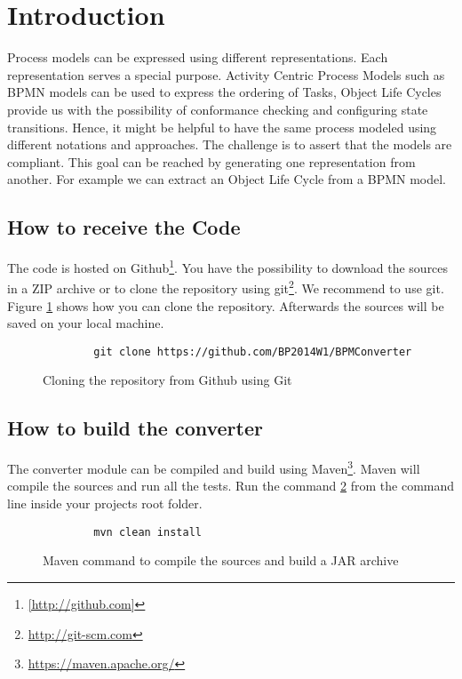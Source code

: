 \section{Introduction}

Process models can be expressed using different representations.
Each representation serves a special purpose.
Activity Centric Process Models such as BPMN models can be used to express the ordering of Tasks, Object Life Cycles provide us with the possibility of conformance checking and configuring state transitions.
Hence, it might be helpful to have the same process modeled using different notations and approaches.
The challenge is to assert that the models are compliant.
This goal can be reached by generating one representation from another.
For example we can extract an Object Life Cycle from a BPMN model.

\subsection{How to receive the Code}

The code is hosted on Github\footnote{\url{[http://github.com]}}.
You have the possibility to download the sources in a ZIP archive or to clone the repository using git\footnote{\url{http://git-scm.com}}.
We recommend to use git.
Figure \ref{lis:clone} shows how you can clone the repository.
Afterwards the sources will be saved on your local machine.

\begin{figure}[h]
	\begin{verbatim}
		git clone https://github.com/BP2014W1/BPMConverter
	\end{verbatim}
	\caption{Cloning the repository from Github using Git}
	\label{lis:clone}
\end{figure}

\subsection{How to build the converter}
\label{subsec:build}

The converter module can be compiled and build using Maven\footnote{\url{https://maven.apache.org/}}.
Maven will compile the sources and run all the tests.
Run the command \ref{lis:mvn} from the command line inside your projects root folder.

\begin{figure}[h]
	\begin{verbatim}
		mvn clean install
	\end{verbatim}
	\caption{Maven command to compile the sources and build a JAR archive}
	\label{lis:mvn}
\end{figure}